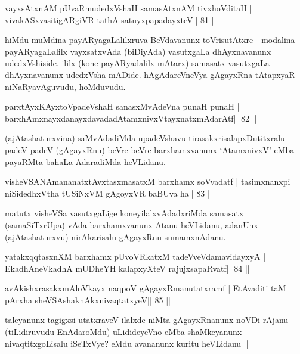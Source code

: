\begin{shl}
vayxsAtxnAM pUvaRmudedxVshaH samasAtxnAM tivxhoVditaH |
vivakASxvasitigARgiVR tathA satuyxpapadayxteV\hfill || 81 ||
\end{shl}

\begin{artha}
hiMdu muMdina payARyagaLalilxruva BeVdavanunx toVrisutAtxre - modalina  payARyagaLalilx vayxsatxvAda (biDiyAda) vasutxgaLa dhAyxnavanunx  udedxVshiside. ililx (kone payARyadalilx mAtarx) samasatx vasutxgaLa  dhAyxnavanunx udedxVsha mADide. hAgAdareVneVya gAgayxRna tAtapxyaR niNaRyavAguvudu, hoMduvudu.
\end{artha}

\begin{shl}
parxtAyxKAyxtoVpadeVshaH sanasxMvAdeVna punaH punaH |
barxhAmxnayxdanayxdavadadAtamxnivxVtayxnatxmAdarAtf\hfill || 82 ||
\end{shl}

\begin{artha}
(ajAtashaturxvina) saMvAdadiMda upadeVshavu tirasakxrisalapxDutitxralu padeV padeV (gAgayxRnu) beVre beVre barxhamxvanunx `AtamxnivxV' eMba payaRMta bahaLa AdaradiMda heVLidanu.
\end{artha}

\begin{shl}
visheVSANAmananatxtAvxtasxmasatxM barxhamx soV\s vadatf |
tasimxnanxpi niSidedhxV\s tha tUSiNxVM gAgoyxVR baBUva ha\hfill || 83 ||
\end{shl}

\begin{artha}
matutx visheVSa vasutxgaLige koneyilalxvAdadxriMda samasatx  (samaSiTxrUpa) vAda barxhamxvanunx Atanu heVLidanu, adanUnx (ajAtashaturxvu) nirAkarisalu gAgayxRnu sumamxnAdanu.
\end{artha}

\begin{shl}
yatakxqqtasxnXM barxhamx pUvoVRkatxM tadeVveVdamavidayxyA |
EkadhA\s neVkadhA mUDheYH kalapxyXteV rajujxsapaRvatf\hfill || 84 ||
\end{shl}

\begin{shl}
avAkishxrasakxmAloVkayx naqpoV gAgayxRmanutatxramf |
EtAvaditi taM pArxha sheVSAshaknAkxnivaqtatxyeV\hfill || 85 ||
\end{shl}

\begin{artha}
taleyanunx tagigxsi utatxraveV ilalxde niMta gAgayxRnanunx noVDi rAjanu (tiLidi\-ruvudu EnAdaroMdu) uLidideyeVno eMba shaMkeyanunx nivaqtitxgoLisalu iSeTxVye? eMdu avananunx kuritu heVLidanu ||
\end{artha} 

